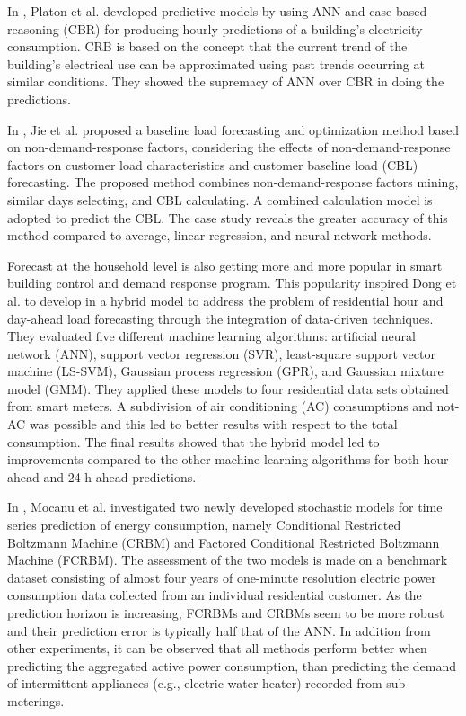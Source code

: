 In \cite{PLATON201510}, Platon et al. developed predictive models by using ANN and case-based reasoning (CBR) for producing hourly predictions of a building’s electricity consumption.
CRB is based on the concept that the current trend of the building's electrical use can be approximated using past trends occurring at similar conditions.
They showed the supremacy of ANN over CBR in doing the predictions.

In \cite{7576207}, Jie et al. proposed a baseline load forecasting and optimization method based on non-demand-response factors, considering the effects of non-demand-response factors on customer load characteristics and customer baseline load (CBL) forecasting.
The proposed method combines non-demand-response factors mining, similar days selecting, and CBL calculating.
A combined calculation model is adopted to predict the CBL.
The case study reveals the greater accuracy of this method compared to average, linear regression, and neural network methods.

Forecast at the household level is also getting more and more popular in smart building control and demand response program.
This popularity inspired Dong et al. to develop in \cite{DONG2016341} a hybrid model to address the problem of residential hour and day-ahead load forecasting through the integration of data-driven techniques.
They evaluated five different machine learning algorithms: artificial neural network (ANN), support vector regression (SVR), least-square support vector machine (LS-SVM), Gaussian process regression (GPR), and Gaussian mixture model (GMM).
They applied these models to four residential data sets obtained from smart meters.
A subdivision of air conditioning (AC) consumptions and not-AC was possible and this led to better results with respect to the total consumption.
The final results showed that the hybrid model led to improvements compared to the other machine learning algorithms for both hour-ahead and 24-h ahead predictions.

In \cite{MOCANU201691}, Mocanu et al. investigated two newly developed stochastic models for time series prediction of energy consumption, namely Conditional Restricted Boltzmann Machine (CRBM) and Factored Conditional Restricted Boltzmann Machine (FCRBM).
The assessment of the two models is made on a benchmark dataset consisting of almost four years of one-minute resolution electric power consumption data collected from an individual residential customer.
As the prediction horizon is increasing, FCRBMs and CRBMs seem to be more robust and their prediction error is typically half that of the ANN.
In addition from other experiments, it can be observed that all methods perform better when predicting the aggregated active power consumption, than predicting the demand of intermittent appliances (e.g., electric water heater) recorded from sub-meterings.

